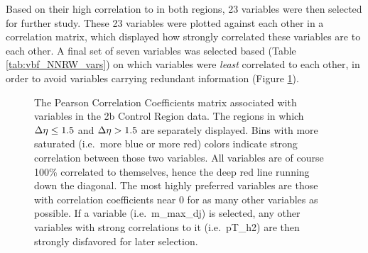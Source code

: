     Based on their high correlation to \mhh in both \deta regions, 23 variables were then selected for further study.
    These 23 variables were plotted against each other in a correlation matrix,
        which displayed how strongly correlated these variables are to each other.
    A final set of seven variables was selected based (Table \ref{tab:vbf_NNRW_vars}) on which variables were \textit{least} correlated to each other,
        in order to avoid variables carrying redundant information (Figure \ref{fig:vbf_corr_matrix}).

    \begin{figure}[!htbp]
        \caption{
            The Pearson Correlation Coefficients matrix associated with variables in the 2b Control Region data.
            The regions in which $\Delta \eta \leq 1.5$ and $\Delta \eta>1.5$ are separately displayed.
            Bins with more saturated (i.e.\ more blue or more red) colors indicate strong correlation between those two variables.
            All variables are of course 100\% correlated to themselves, hence the deep red line running down the diagonal.
            The most highly preferred variables are those with correlation coefficients near 0 for as many other variables as possible.
            If a variable (i.e.\ m\_max\_dj) is selected, any other variables with strong correlations to it (i.e.\ pT\_h2)
                are then strongly disfavored for later selection.
        }
        \label{fig:vbf_corr_matrix}
    \end{figure}


